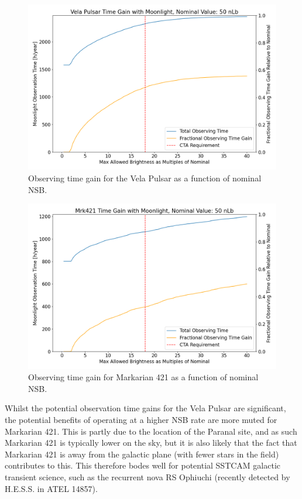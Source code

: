 \begin{figure}[h!]
\begin{centering}
\includegraphics[width=\columnwidth]{./figures/obstime_VelaPulsar_nom.png}
\caption{Observing time gain for the Vela Pulsar as a function of nominal NSB.}
\label{fig:obstimegainvelapulsar}
\end{centering}
\end{figure}

\begin{figure}[h!]
\begin{centering}
\includegraphics[width=\columnwidth]{./figures/obstime_mrk421_nom.png}
\caption{Observing time gain for Markarian 421 as a function of nominal NSB.}
\label{fig:obstimegainmrk421}
\end{centering}
\end{figure}

Whilst the potential observation time gains for the Vela Pulsar are significant, the potential benefits of operating at a higher NSB rate are more muted for Markarian 421. This is partly due to the location of the Paranal site, and as such Markarian 421 is typically lower on the sky, but it is also likely that the fact that Markarian 421 is away from the galactic plane (with fewer stars in the field) contributes to this. This therefore bodes well for potential SSTCAM galactic transient science, such as the recurrent nova RS Ophiuchi (recently detected by H.E.S.S. in ATEL 14857). 

